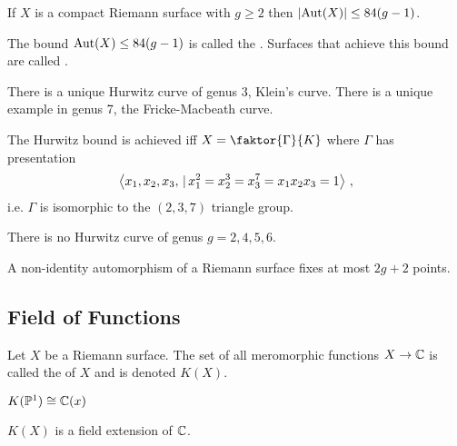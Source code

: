\documentclass{article}
\begin{document}
\begin{theorem}
	If $X$ is a compact Riemann surface with $g\geq 2$ then $\left\lvert \operatorname{Aut}(X) \right\rvert \leq 84(g-1)$. 
\end{theorem}

\begin{definition}
	The bound $\operatorname{Aut}(X) \leq 84(g-1)$ is called the . Surfaces that achieve this bound are called .
\end{definition}

\begin{example}
	There is a unique Hurwitz curve of genus 3, Klein's curve. There is a unique example in genus 7, the Fricke-Macbeath curve. 
\end{example}

\begin{theorem}
	The Hurwitz bound is achieved iff $X = \faktor{\Gamma}{K}$ where $\Gamma$ has presentation 
	\[
	\left\langle x_1, x_2, x_3, \, | \, x_1^2 = x_2^3 = x_3^7 = x_1x_2x_3 = 1 \right\rangle \, , 
	\]
	i.e. $\Gamma$ is isomorphic to the $(2,3,7)$ triangle group. 
\end{theorem}

\begin{theorem}[Wiman, 1895]
	There is no Hurwitz curve of genus $g=2, 4, 5, 6$. 
\end{theorem}

\begin{theorem}
	A non-identity automorphism of a Riemann surface fixes at most $2g+2$ points. 
\end{theorem}
\subsection{Field of Functions}

\begin{definition}
	Let $X$ be a Riemann surface. The set of all meromorphic functions $X \to \mathbb{C}$ is called the  of $X$ and is denoted $K(X)$. 
\end{definition}

\begin{example}
	$K(\mathbb{P}^1) \cong \mathbb{C}(x)$
\end{example}

\begin{prop}
	$K(X)$ is a field extension of $\mathbb{C}$. 
\end{prop}
\end{document}
